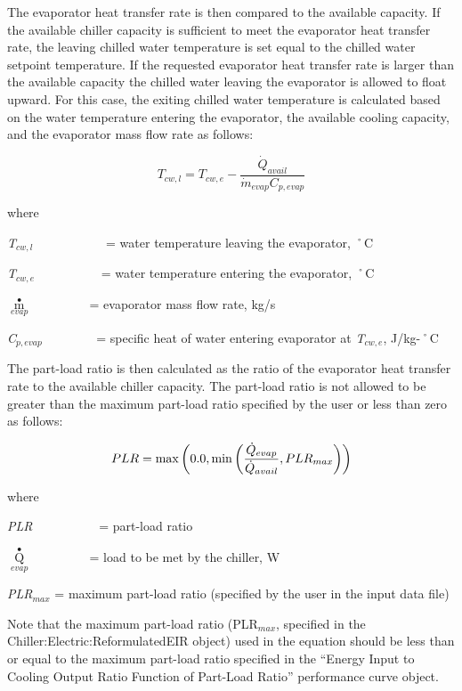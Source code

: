 The evaporator heat transfer rate is then compared to the available capacity. If the available chiller capacity is sufficient to meet the evaporator heat transfer rate, the leaving chilled water temperature is set equal to the chilled water setpoint temperature. If the requested evaporator heat transfer rate is larger than the available capacity the chilled water leaving the evaporator is allowed to float upward. For this case, the exiting chilled water temperature is calculated based on the water temperature entering the evaporator, the available cooling capacity, and the evaporator mass flow rate as follows:

\begin{equation}
  T_{cw,l}  =  T_{cw,e} - \frac{\dot{Q}_{avail}}{\dot{m}_{evap}C_{p,evap}}
\end{equation}

where

\emph{T\(_{cw,l}\)}~~~~~~~~~~~ = water temperature leaving the evaporator, ˚C

\emph{T\(_{cw,e}\)}~~~~~~~~~~ = water temperature entering the evaporator, ˚C

\({\mathop m\limits^ \bullet_{evap}}\) ~~~~~~~~ = evaporator mass flow rate, kg/s

\emph{C\(_{p,evap}\)}~~~~~~~~ = specific heat of water entering evaporator at \emph{T\(_{cw,e}\)}, J/kg-˚C

The part-load ratio is then calculated as the ratio of the evaporator heat transfer rate to the available chiller capacity. The part-load ratio is not allowed to be greater than the maximum part-load ratio specified by the user or less than zero as follows:

\begin{equation}
  PLR = \max\left(0.0,\min\left(\frac{\dot{Q}_{evap}}{\dot{Q}_{avail}},PLR_{max}\right)\right)
\end{equation}

where

\emph{PLR}~~~~~~~~~~ = part-load ratio

\({\mathop Q\limits^ \bullet_{evap}}\) ~~~~~~~~ = load to be met by the chiller, W

\emph{PLR\(_{max}\)} = maximum part-load ratio (specified by the user in the input data file)

Note that the maximum part-load ratio (PLR\(_{max}\), specified in the Chiller:Electric:ReformulatedEIR object) used in the equation should be less than or equal to the maximum part-load ratio specified in the ``Energy Input to Cooling Output Ratio Function of Part-Load Ratio'' performance curve object.

